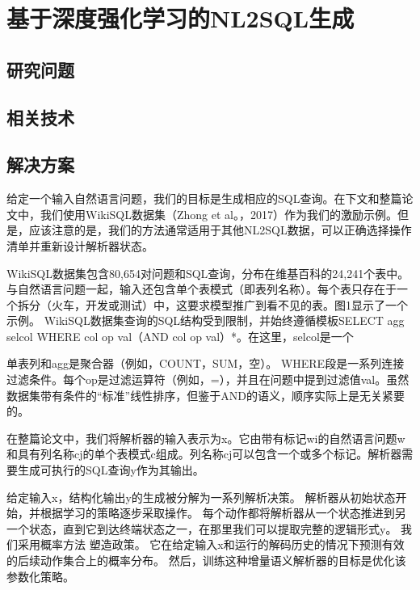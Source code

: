 
\chapter{基于深度强化学习的NL2SQL生成}
\label{chap:enl2sql}

\section{研究问题}
\section{相关技术}
\section{解决方案}



给定一个输入自然语言问题，我们的目标是生成相应的SQL查询。在下文和整篇论文中，我们使用WikiSQL数据集（Zhong et al。，2017）作为我们的激励示例。但是，应该注意的是，我们的方法通常适用于其他NL2SQL数据，可以正确选择操作清单并重新设计解析器状态。

WikiSQL数据集包含80,654对问题和SQL查询，分布在维基百科的24,241个表中。与自然语言问题一起，输入还包含单个表模式（即表列名称）。每个表只存在于一个拆分（火车，开发或测试）中，这要求模型推广到看不见的表。图1显示了一个示例。 WikiSQL数据集查询的SQL结构受到限制，并始终遵循模板SELECT agg selcol WHERE col op val（AND col op val）*。在这里，selcol是一个

单表列和agg是聚合器（例如，COUNT，SUM，空）。 WHERE段是一系列连接过滤条件。每个op是过滤运算符（例如，=），并且在问题中提到过滤值val。虽然数据集带有条件的“标准”线性排序，但鉴于AND的语义，顺序实际上是无关紧要的。

在整篇论文中，我们将解析器的输入表示为x。它由带有标记wi的自然语言问题w和具有列名称cj的单个表模式c组成。列名称cj可以包含一个或多个标记。解析器需要生成可执行的SQL查询y作为其输出。

给定输入x，结构化输出y的生成被分解为一系列解析决策。 解析器从初始状态开始，并根据学习的策略逐步采取操作。 每个动作都将解析器从一个状态推进到另一个状态，直到它到达终端状态之一，在那里我们可以提取完整的逻辑形式y。 我们采用概率方法
塑造政策。 它在给定输入x和运行的解码历史的情况下预测有效的后续动作集合上的概率分布。 然后，训练这种增量语义解析器的目标是优化该参数化策略。

